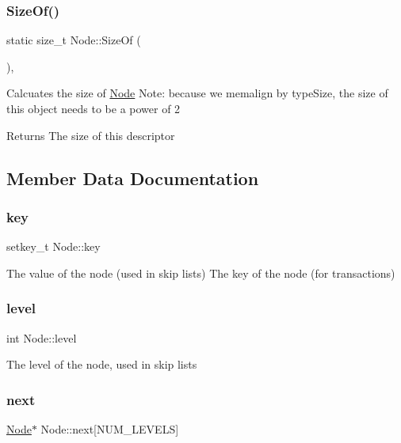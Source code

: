 \subsubsection{\texorpdfstring{Size\+Of()}{SizeOf()}}
{\footnotesize\ttfamily static size\+\_\+t Node\+::\+Size\+Of (\begin{DoxyParamCaption}{ }\end{DoxyParamCaption})\hspace{0.3cm}{\ttfamily [inline]}, {\ttfamily [static]}}

Calcuates the size of \hyperlink{structNode}{Node} Note\+: because we memalign by type\+Size, the size of this object needs to be a power of 2

\begin{DoxyReturn}{Returns}
The size of this descriptor 
\end{DoxyReturn}


\subsection{Member Data Documentation}
\mbox{\label{structNode_a3499b8b8442463365dd1cb7bce41b3d5}} 
\subsubsection{\texorpdfstring{key}{key}}
{\footnotesize\ttfamily setkey\+\_\+t Node\+::key}

The value of the node (used in skip lists) The key of the node (for transactions) \mbox{\label{structNode_a8728a644d0aa9bcc8fc6a6f935077277}} 
\subsubsection{\texorpdfstring{level}{level}}
{\footnotesize\ttfamily int Node\+::level}

The level of the node, used in skip lists \mbox{\label{structNode_ad97b8a94c8f12b5f679ba5318e268733}} 
\subsubsection{\texorpdfstring{next}{next}}
{\footnotesize\ttfamily \hyperlink{structNode}{Node}$\ast$ Node\+::next\mbox{[}N\+U\+M\+\_\+\+L\+E\+V\+E\+LS\mbox{]}}

